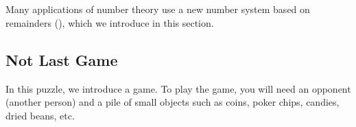 \section{\secmodarith}
\label{sec_mod_arith}

Many applications of number theory use a new number system based on remainders (), which we introduce in this section. 


\newcommand{\subnotlast}{Not Last Game}
\subsection{\subnotlast}
\label{sub_not_last}


In this puzzle, we introduce a game. To play the game, you will need an opponent (another person) and a pile of small objects such as coins, poker chips, candies, dried beans, etc.

